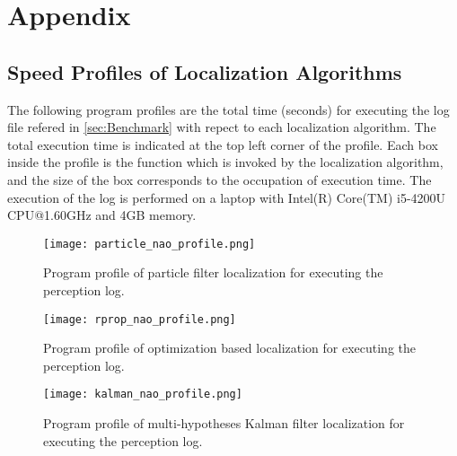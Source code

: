 \chapter{Appendix}\label{testdat}

\section{Speed Profiles of Localization Algorithms}\label{sec:profiles}
The following program profiles are the total time (seconds) for executing the log file refered in \autoref{sec:Benchmark} with repect to each localization algorithm. The total execution time is indicated at the top left corner of the profile. Each box inside the profile is the function which is invoked by the localization algorithm, and the size of the box corresponds to the occupation of execution time. The execution of the log is performed on a laptop with Intel(R) Core(TM) i5-4200U CPU@1.60GHz and 4GB memory. 

\begin{figure}[h!]
  \texttt{[image: particle\_nao\_profile.png]}
  \caption{Program profile of particle filter localization for executing the perception log.}
    \label{fig:profile_partcile}
\end{figure}

\begin{figure}[h!]
  \texttt{[image: rprop\_nao\_profile.png]}
    \caption{Program profile of optimization based localization for executing the perception log. }
    \label{fig:profile_rprop}
\end{figure}

\begin{figure}[h!]
  \texttt{[image: kalman\_nao\_profile.png]}
    \caption{Program profile of multi-hypotheses Kalman filter localization for executing the perception log.}
    \label{fig:profile_kalman}
\end{figure}


